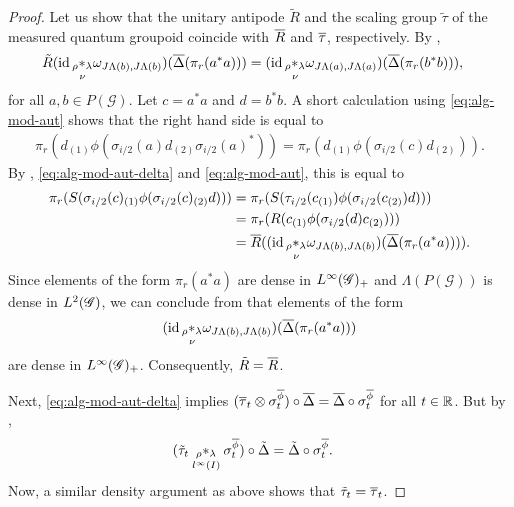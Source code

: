 \begin{proof}
Let us show   that the unitary antipode  $\tilde R$ and the
  scaling group   $\tilde\tau$ of the measured quantum groupoid
  coincide with $\overline{R}$ and $\overline{\tau}$, respectively.
  By \cite[Theorem A.6]{Eno2},
  \begin{align*}
    \tilde R(\operatorname{id} \underset{\nu}{_{\rho} \ast_{\lambda}}
    \omega_{J\Lambda(b),J\Lambda(b)})(\overline{\Delta}(\pi_{r}(a^{*}a))) &= (\operatorname{id}
    \underset{\nu}{_{\rho} \ast_{\lambda}}
    \omega_{J\Lambda(a),J\Lambda(a)})(\overline{\Delta}(\pi_{r}(b^{*}b))),
  \end{align*}
  for all $a,b\in P(\mathscr{G})$.  Let $c=a^{*}a$ and $d=b^{*}b$.  A
  short calculation using \eqref{eq:alg-mod-aut} shows that the right hand
  side is equal to
\begin{align*}
  \pi_{r} ( d_{(1)}\phi(\sigma_{i/2}(a)d_{(2)}\sigma_{i/2}(a)^{*})) =
  \pi_{r}(d_{(1)}\phi(\sigma_{i/2}(c)d_{(2)})).
  \end{align*}
By \cite[Lemma 1.37]{DCT1},  \eqref{eq:alg-mod-aut-delta} and
  \eqref{eq:alg-mod-aut},  this is equal to
  \begin{align*}
   \pi_{r}(S(\sigma_{i/2}(c)_{(1)}\phi(\sigma_{i/2}(c)_{(2)}d))) &=
   \pi_{r}(S(\tau_{i/2}(c_{(1)})\phi(\sigma_{i/2}(c_{(2)})d))) \\
   &= \pi_{r}(R(c_{(1)}\phi(\sigma_{i/2}(d)c_{(2)}))) \\
   &=\overline{R}((\operatorname{id} \underset{\nu}{_{\rho} \ast_{\lambda}}
    \omega_{J\Lambda(b),J\Lambda(b)})(\overline{\Delta}(\pi_{r}(a^{*}a)))).
  \end{align*}
  Since elements of the form $\pi_{r}(a^{*}a)$ are dense in
  $L^{\infty}(\mathscr{G})_{+}$ and $\Lambda(P(\mathscr{G}))$ is dense in $L^{2}(\mathscr{G})$, we
  can conclude from \cite[Theorem A.7]{Eno2} that elements of the form
  \begin{align*}
  (\operatorname{id} \underset{\nu}{_{\rho}
    \ast_{\lambda}}
  \omega_{J\Lambda(b),J\Lambda(b)})(\overline{\Delta}(\pi_{r}(a^{*}a)))  
  \end{align*}
 are
  dense in $L^{\infty}(\mathscr{G})_{+}$. Consequently, $\tilde R=\overline{R}$. 

Next,  \eqref{eq:alg-mod-aut-delta} implies $(\overline{\tau}_{t} \otimes
  \sigma^{\overline{\phi}}_{t}) \circ \overline{\Delta} = \overline{\Delta} \circ
  \sigma^{\overline{\phi}}_{t}$ for all $t\in \mathbb{R}$.  But by \cite[Theorem
  A.5]{Eno2},
  \begin{align*}
    (\tilde \tau_{t} \underset{l^{\infty}(I)}{_{\rho}\ast_{\lambda}} \sigma^{\overline{\phi}}_{t}) \circ \tilde \Delta
    &=\tilde \Delta \circ \sigma^{\overline{\phi}}_{t}.
  \end{align*}
Now,  a similar density  argument as above shows that
  $\tilde \tau_{t}=\overline{\tau}_{t}$.
\end{proof}

